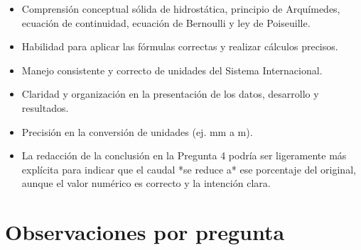 \documentclass[11pt,a4paper]{article}
\begin{document}
\vspace{4pt}
\begin{minipage}[t]{0.48\linewidth}
  \begin{tcolorbox}[cajaFortaleza, title={Fortalezas}]
\begin{itemize}[leftmargin=1.5em, itemsep=2pt]
  \item Comprensión conceptual sólida de hidrostática, principio de Arquímedes, ecuación de continuidad, ecuación de Bernoulli y ley de Poiseuille.
  \item Habilidad para aplicar las fórmulas correctas y realizar cálculos precisos.
  \item Manejo consistente y correcto de unidades del Sistema Internacional.
  \item Claridad y organización en la presentación de los datos, desarrollo y resultados.
  \item Precisión en la conversión de unidades (ej. mm a m).
\end{itemize}
  \end{tcolorbox}
\end{minipage}
\hfill
\begin{minipage}[t]{0.48\linewidth}
  \begin{tcolorbox}[cajaMejora, title={Areas de mejora}]
\begin{itemize}[leftmargin=1.5em, itemsep=2pt]
  \item La redacción de la conclusión en la Pregunta 4 podría ser ligeramente más explícita para indicar que el caudal *se reduce a* ese porcentaje del original, aunque el valor numérico es correcto y la intención clara.
\end{itemize}
  \end{tcolorbox}
\end{minipage}

\section*{Observaciones por pregunta}
\end{document}
